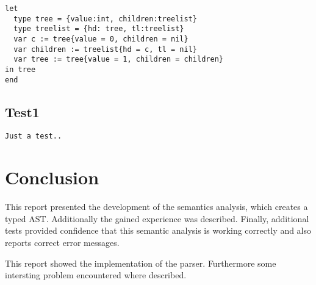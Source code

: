 \documentclass{article}
\begin{document}
\begin{lstlisting}[frame=single]
let
  type tree = {value:int, children:treelist}
  type treelist = {hd: tree, tl:treelist}
  var c := tree{value = 0, children = nil}
  var children := treelist{hd = c, tl = nil}
  var tree := tree{value = 1, children = children}
in tree
end
\end{lstlisting}

\subsection{Test1}

\begin{lstlisting}[frame=single]
Just a test..
\end{lstlisting}

\section{Conclusion}
This report presented the development of the semantics analysis, which creates a typed AST. Additionally the gained experience was described. Finally, additional tests provided confidence that this semantic analysis is working correctly and also reports correct error messages.

This report showed the implementation of the parser. Furthermore some intersting problem encountered where described. 
\end{document}
